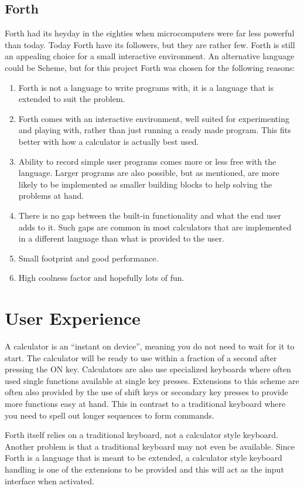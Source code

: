 \documentclass[a4paper]{article}
\begin{document}
\subsection{Forth}
Forth had its heyday in the eighties when microcomputers were far less powerful than today.
Today Forth have its followers, but they are rather few. Forth is still an appealing choice for a small interactive environment. An alternative language could be Scheme, but for this project Forth was chosen for the following reasons:
\begin{enumerate}
\item Forth is not a language to write programs with, it is a language that is extended to suit the problem.
\item Forth comes with an interactive environment, well suited for experimenting and playing with, rather than just running a ready made program.  This fits better with how a calculator is actually best used.
\item Ability to record simple user programs comes more or less free with the language. Larger programs are also possible, but as mentioned, are more likely to be implemented as smaller building blocks to help solving the problems at hand.
\item There is no gap between the built-in functionality and what the end user adds to it. Such gaps are common in most calculators that are implemented in a different language than what is provided to the user.
\item Small footprint and good performance.
\item High coolness factor and hopefully lots of fun.
\end{enumerate}

\section{User Experience}
A calculator is an ``instant on device'', meaning you do not need to wait for it to start. The calculator will be ready to use within a fraction of a second after pressing the ON key. Calculators are also use specialized keyboards where often used single functions available at single key presses. Extensions to this scheme are often also provided by the use of shift keys or secondary key presses to provide more functions easy at hand. This in contrast to a traditional keyboard where you need to spell out longer sequences to form commands.

Forth itself relies on a traditional keyboard, not a calculator style keyboard. Another problem is that a traditional keyboard may not even be available. Since Forth is a language that is meant to be extended, a calculator style keyboard handling is one of the extensions to be provided and this will act as the input interface when activated.
\end{document}
